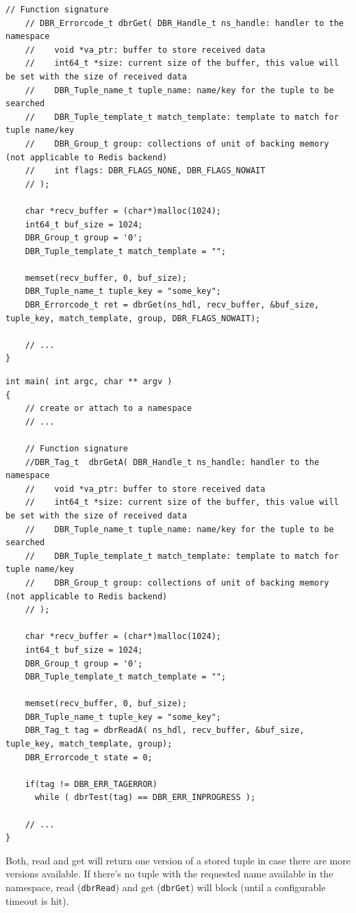\begin{enumerate}
\begin{lstlisting}[style=mystyle,basicstyle=\scriptsize\ttfamily,caption=Get data from the namespace (blocking), label=code:get]
    // Function signature
    // DBR_Errorcode_t dbrGet( DBR_Handle_t ns_handle: handler to the namespace
    //    void *va_ptr: buffer to store received data
    //    int64_t *size: current size of the buffer, this value will be set with the size of received data 
    //    DBR_Tuple_name_t tuple_name: name/key for the tuple to be searched
    //    DBR_Tuple_template_t match_template: template to match for tuple name/key
    //    DBR_Group_t group: collections of unit of backing memory (not applicable to Redis backend)
    //    int flags: DBR_FLAGS_NONE, DBR_FLAGS_NOWAIT
    // );

	char *recv_buffer = (char*)malloc(1024);
	int64_t buf_size = 1024;
	DBR_Group_t group = '0';
	DBR_Tuple_template_t match_template = "";
	
	memset(recv_buffer, 0, buf_size);
	DBR_Tuple_name_t tuple_key = "some_key";
	DBR_Errorcode_t ret = dbrGet(ns_hdl, recv_buffer, &buf_size, tuple_key, match_template, group, DBR_FLAGS_NOWAIT);
	
	// ...
}
\end{lstlisting}

  \begin{lstlisting}[style=mystyle,basicstyle=\scriptsize\ttfamily,caption=Get data from the namespace (non-blocking), label=code:getA]
int main( int argc, char ** argv )
{
	// create or attach to a namespace
	// ...

    // Function signature
    //DBR_Tag_t  dbrGetA( DBR_Handle_t ns_handle: handler to the namespace 
    //    void *va_ptr: buffer to store received data
    //    int64_t *size: current size of the buffer, this value will be set with the size of received data 
    //    DBR_Tuple_name_t tuple_name: name/key for the tuple to be searched
    //    DBR_Tuple_template_t match_template: template to match for tuple name/key
    //    DBR_Group_t group: collections of unit of backing memory (not applicable to Redis backend)
    // );
	
	char *recv_buffer = (char*)malloc(1024);
	int64_t buf_size = 1024;
	DBR_Group_t group = '0';
	DBR_Tuple_template_t match_template = "";

	memset(recv_buffer, 0, buf_size);
	DBR_Tuple_name_t tuple_key = "some_key";
	DBR_Tag_t tag = dbrReadA( ns_hdl, recv_buffer, &buf_size, tuple_key, match_template, group);
	DBR_Errorcode_t state = 0; 

	if(tag != DBR_ERR_TAGERROR)
      while ( dbrTest(tag) == DBR_ERR_INPROGRESS );
	
	// ...
}
\end{lstlisting}
Both, read and get will return one version of a stored tuple in case
there are more versions available.  If there's no tuple with the
requested name available in the namespace, read (\texttt{dbrRead}) and get (\texttt{dbrGet}) will block
(until a configurable timeout is hit). 
\end{enumerate}


